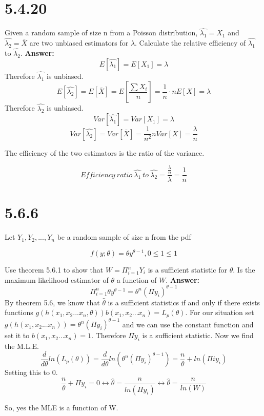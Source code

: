 \documentclass[11pt]{article}
\begin{document}
\section{5.4.20}
Given a random sample of size n from a Poisson distribution, $\hat{\lambda_1} = X_1$ and $\hat{\lambda_2} = \bar{X}$ are two unbiased estimators for $\lambda$. Calculate the relative efficiency of $\hat{\lambda_1}$ to $\hat{\lambda_2} $.
\textbf{Answer:}
$$E[\hat{\lambda_1}] =E[ X_1]=\lambda$$
Therefore $\hat{\lambda_1}$ is unbiased.
$$E[\hat{\lambda_2}] =E[ \bar{X}]=E[\frac{\sum X_i}{n}] = \frac{1}{n}\cdot  n E[X]=\lambda$$
Therefore $\hat{\lambda_2}$ is unbiased.
$$Var[\hat{\lambda_1}]=Var[X_1] = \lambda$$
$$Var[\hat{\lambda_2}]=Var[\bar{X}] = \frac{1}{n^2} n Var[X] = \frac{\lambda}{n}$$

The efficiency of the two estimators is the ratio of the variance.

$$Efficiency\ ratio\ \hat{\lambda_1}\ to \ \hat{\lambda_2} = \frac{\frac{\lambda}{n}}{\lambda}= \frac{1}{n}$$
\section{5.6.6}
 Let $Y_1,Y_2,...,Y_n$ be a random sample of size n from the pdf
 
 $$f(y;\theta)=\theta y^{\theta - 1}, 0\leq 1 \leq 1$$

Use theorem 5.6.1 to show that $W=\Pi^{n}_{i=1}Y_i$ is a sufficient statistic for $\theta$. Is the maximum likelihood estimator of $\theta$ a function of $W$.
\newline
\newline
\textbf{Answer:}
$$\Pi_{i=1}^{n}\theta y^{\theta - 1}=\theta^n (\Pi y_i)^{\theta - 1}$$
By theorem 5.6, we know that $\hat{\theta}$ is a sufficient statistics if and only if there exists functions $g(h(x_1,x_2...x_n,\theta))b(x_1,x_2...x_n)=L_p(\theta)$. For our situation set $g(h(x_1,x_2...x_n)) = \theta^n(\Pi y_i)^{\theta - 1}$ and we can use the constant function and set it to $b(x_1,x_2...x_n)  = 1$. Therefore $\Pi y_i$ is a sufficient statistic.
\newline
\newline
Now we find the M.L.E.
$$\frac{d}{d\theta}ln(L_p(\theta)) = \frac{d}{d\theta}ln(\theta^n (\Pi y_i)^{\theta - 1})=\frac{n}{\theta} + ln(\Pi iy_i)$$
Setting this to 0.
$$\frac{n}{\theta} + \Pi y_i= 0 \leftrightarrow \hat{\theta} = \frac{n}{ln(\Pi y_i)} \leftrightarrow \hat{\theta} = \frac{n}{ln(W)}$$

So, yes the MLE is a function of W. 
\end{document}
